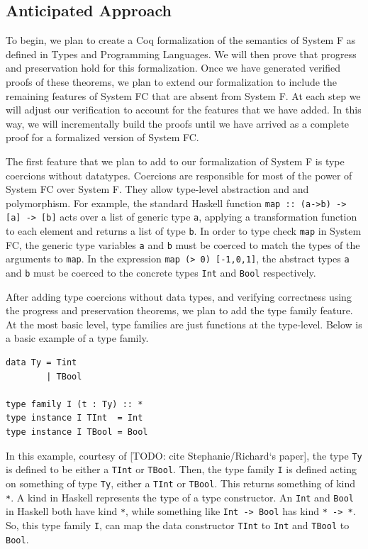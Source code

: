 \documentclass{sig-alternate}
\begin{document}
\subsection{Anticipated Approach}
\label{subsec:approach}
To begin, we plan to create a Coq formalization of the semantics of System F as defined in Types and Programming Languages. We will then prove that progress and preservation hold for this formalization. Once we have generated verified proofs of these theorems, we plan to extend our formalization to include the remaining features of System FC that are absent from System F.  At each step we will adjust our verification to account for the features that we have added.  In this way, we will incrementally build the proofs until we have arrived as a complete proof for a formalized version of System FC.

The first feature that we plan to add to our formalization of System F is type coercions without datatypes.  Coercions are responsible for most of the power of System FC over System F.  They allow type-level abstraction and and polymorphism.  For example, the standard Haskell function \texttt{map :: (a->b) -> [a] -> [b]} acts over a list of generic type \texttt{a}, applying a transformation function to each element and returns a list of type \texttt{b}.  In order to type check \texttt{map} in System FC, the generic type variables \texttt{a} and \texttt{b} must be coerced to match the types of the arguments to \texttt{map}.  In the expression \texttt{map (> 0) [-1,0,1]}, the abstract types \texttt{a} and \texttt{b} must be coerced to the concrete types \texttt{Int} and \texttt{Bool} respectively.

After adding type coercions without data types, and verifying correctness using the progress and preservation theorems, we plan to add the type family feature. At the most basic level, type families are just functions at the type-level. Below is a basic example of a type family.
\begin{verbatim}
data Ty = Tint
        | TBool

type family I (t : Ty) :: *
type instance I TInt  = Int
type instance I TBool = Bool
\end{verbatim}
In this example, courtesy of [TODO: cite Stephanie/Richard`s paper], the type \texttt{Ty} is defined to be either a \texttt{TInt} or \texttt{TBool}. Then, the type family \texttt{I} is defined acting on something of type \texttt{Ty}, either a \texttt{TInt} or \texttt{TBool}. This returns something of kind \texttt{*}. A kind in Haskell represents the type of a type constructor. An \texttt{Int} and \texttt{Bool} in Haskell both have kind \texttt{*}, while something like \texttt{Int -> Bool} has kind \texttt{* -> *}. So, this type family \texttt{I}, can map the data constructor \texttt{TInt} to \texttt{Int} and \texttt{TBool} to \texttt{Bool}.
\end{document}
